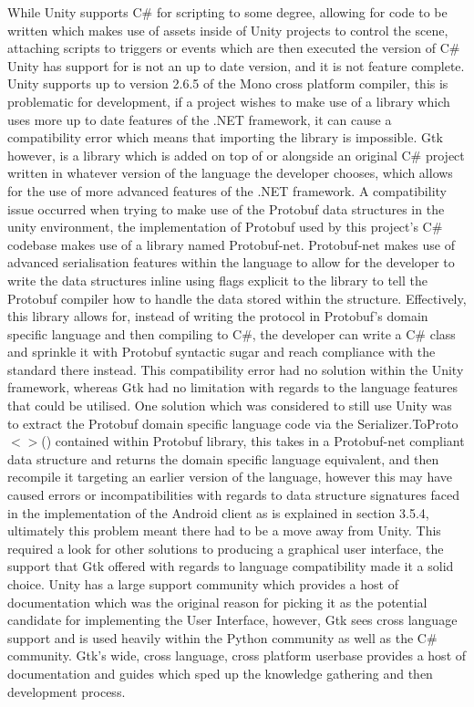 \documentclass{article}
\begin{document}
While Unity supports C\# for scripting to some degree, allowing for code to be written which makes use of assets inside of Unity projects to control the scene, attaching scripts to triggers or events which are then executed the version of C\# Unity has support for is not an up to date version, and it is not feature complete. Unity supports up to version 2.6.5 of the Mono cross platform compiler, this is problematic for development, if a project wishes to make use of a library which uses more up to date features of the .NET framework, it can cause a compatibility error which means that importing the library is impossible. Gtk however, is a library which is added on top of or alongside an original C\# project written in whatever version of the language the developer chooses, which allows for the use of more advanced features of the .NET framework. A compatibility issue occurred when trying to make use of the Protobuf data structures in the unity environment, the implementation of Protobuf used by this project’s C\# codebase makes use of a library named Protobuf-net. Protobuf-net makes use of advanced serialisation features within the language to allow for the developer to write the data structures inline using flags explicit to the library to tell the Protobuf compiler how to handle the data stored within the structure. Effectively, this library allows for, instead of writing the protocol in Protobuf’s domain specific language and then compiling to C\#, the developer can write a C\# class and sprinkle it with Protobuf syntactic sugar and reach compliance with the standard there instead. This compatibility error had no solution within the Unity framework, whereas Gtk had no limitation with regards to the language features that could be utilised. One solution which was considered to still use Unity was to extract the Protobuf domain specific language code via the Serializer.ToProto$<>$() contained within Protobuf library, this takes in a Protobuf-net compliant data structure and returns the domain specific language equivalent, and then recompile it targeting an earlier version of the language, however this may have caused errors or incompatibilities with regards to data structure signatures faced in the implementation of the Android client as is explained in section 3.5.4, ultimately this problem meant there had to be a move away from Unity. This required a look for other solutions to producing a graphical user interface, the support that Gtk offered with regards to language compatibility made it a solid choice. Unity has a large support community which provides a host of documentation which was the original reason for picking it as the potential candidate for implementing the User Interface, however, Gtk sees cross language support and is used heavily within the Python community as well as the C\# community. Gtk’s wide, cross language, cross platform userbase provides a host of documentation and guides which sped up the knowledge gathering and then development process.
\end{document}
